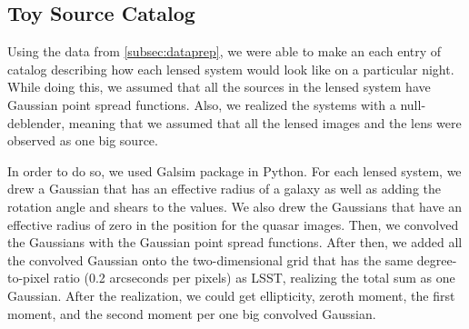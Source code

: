 \documentclass[\docopts]{\docclass}
\begin{document}
\subsection{Toy Source Catalog}

\label{sssec:toysource}

Using the data from \ref{subsec:dataprep}, we were able to make an each entry of catalog describing how each lensed system would look like on a particular night. While doing this, we assumed that all the sources in the lensed system have Gaussian point spread functions. Also, we realized the systems with a null-deblender, meaning that we assumed that all the lensed images and the lens were observed as one big source.

In order to do so, we used Galsim package in Python. For each lensed system, we drew a Gaussian that has an effective radius of a galaxy as well as adding the rotation angle and shears to the values. We also drew the Gaussians that have an effective radius of zero in the position for the quasar images. Then, we convolved the Gaussians with the Gaussian point spread functions. After then, we added all the convolved Gaussian onto the two-dimensional grid that has the same degree-to-pixel ratio (0.2 arcseconds per pixels) as LSST, realizing the total sum as one Gaussian. After the realization, we could get ellipticity, zeroth moment, the first moment, and the second moment per one big convolved Gaussian.
\end{document}
